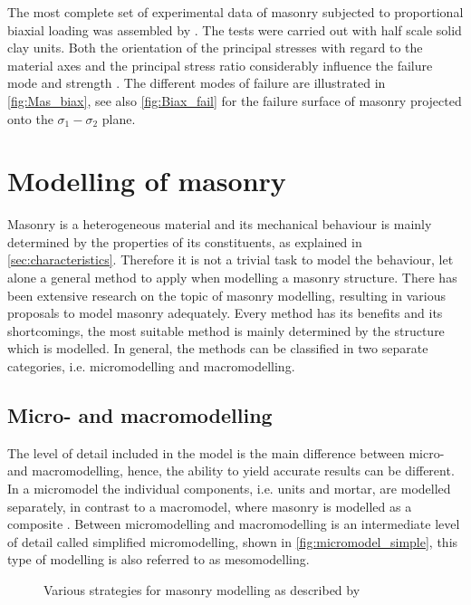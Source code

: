 The most complete set of experimental data of masonry subjected to proportional biaxial loading was assembled by \citet{page1981, page1983}. The tests were carried out with half scale solid clay units. Both the orientation of the principal stresses with regard to the material axes and the principal stress ratio considerably influence the failure mode and strength \cite{lourenco1996}. The different modes of failure are illustrated in \autoref{fig:Mas_biax}, see also \autoref{fig:Biax_fail} for the failure surface of masonry projected onto the $\sigma_{1}-\sigma_{2}$ plane.

\newpage
\section{Modelling of masonry}
\label{sec:modelling}
Masonry is a heterogeneous material and its mechanical behaviour is mainly determined by the properties of its constituents, as explained in \autoref{sec:characteristics}. Therefore it is not a trivial task to model the behaviour, let alone a general method to apply when modelling a masonry structure. There has been extensive research on the topic of masonry modelling, resulting in various proposals to model masonry adequately. Every method has its benefits and its shortcomings, the most suitable method is mainly determined by the structure which is modelled. In general, the methods can be classified in two separate categories, i.e. micromodelling and macromodelling.

\subsection{Micro- and macromodelling}
\label{sec:micromacro}
The level of detail included in the model is the main difference between micro- and macromodelling, hence, the ability to yield accurate results can be different. In a micromodel the individual components, i.e. units and mortar, are modelled separately, in contrast to a macromodel, where masonry is modelled as a composite \cite{lourenco1996}. Between micromodelling and macromodelling is an intermediate level of detail called simplified micromodelling, shown in \autoref{fig:micromodel_simple}, this type of modelling is also referred to as mesomodelling. 

\begin{figure}[!htb]
    \centering
     \hfill
     \hfill
     \hfill
    \caption{Various strategies for masonry modelling as described by \citet{lourenco1996}}
    \label{fig:Model_strate}
\end{figure}

